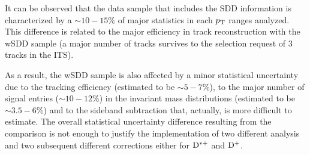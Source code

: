 It can be observed that the data sample that includes the SDD information is characterized by a $\sim 10-15\%$ of major statistics in each $p_{\rm T}$ ranges analyzed. This difference is related to the major efficiency in track reconstruction with the wSDD sample (a major number of tracks survives to the selection request of 3 tracks in the ITS).

As a result, the wSDD sample is also affected by a minor statistical uncertainty due to the tracking efficiency (estimated to be $\sim 5-7\%$), to the major number of signal entries ($\sim 10-12\%$) in the invariant mass distributions (estimated to be $\sim 3.5 - 6\%$) and to the sideband subtraction that, actually, is more difficult to estimate.
The overall statistical uncertainty difference resulting from the comparison is not enough to justify the implementation of two different analysis and two subsequent different corrections either for ${\rm D^{*+}}$ and ${\rm D^+}$.


